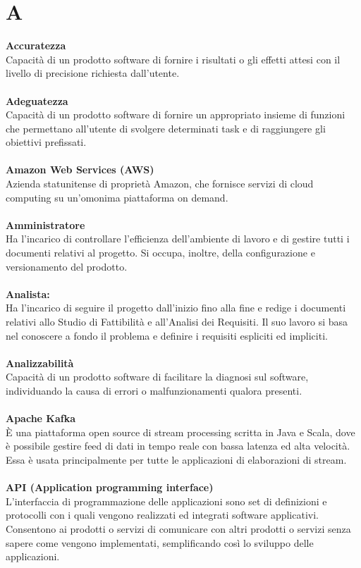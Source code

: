 \section{A}
\textbf{Accuratezza}\\
Capacità di un prodotto software di fornire i risultati o gli effetti attesi con il livello di precisione richiesta
dall'utente.\\ \\
\textbf{Adeguatezza}\\
Capacità di un prodotto software di fornire un appropriato insieme di funzioni che permettano all'utente di svolgere determinati task e di raggiungere gli obiettivi prefissati.\\ \\
\textbf{Amazon Web Services (AWS)}\\
Azienda statunitense di proprietà Amazon, che fornisce servizi di cloud computing su un'omonima piattaforma on demand. \\ \\
\textbf{Amministratore}\\
Ha l'incarico di controllare l'efficienza dell'ambiente di lavoro e di gestire tutti i documenti relativi al progetto. Si occupa, inoltre, della configurazione e versionamento del prodotto.\\ \\
\textbf{Analista:}\\
Ha l'incarico di seguire il progetto dall'inizio fino alla fine e redige i documenti relativi allo Studio di Fattibilità e all'Analisi dei Requisiti. Il suo lavoro si basa nel conoscere a fondo il problema e definire i requisiti espliciti ed impliciti.\\ \\
\textbf{Analizzabilità}\\
Capacità di un prodotto software di facilitare la diagnosi sul software, individuando la causa di errori o malfunzionamenti qualora presenti.\\ \\
\textbf{Apache Kafka}\\
È una piattaforma open source di stream processing scritta in Java e Scala, dove è possibile gestire feed di dati in tempo reale con bassa latenza ed alta velocità. Essa è usata principalmente per tutte le applicazioni di elaborazioni di stream.  \\ \\
\textbf{API (Application programming interface)}\\
L'interfaccia di programmazione delle applicazioni sono set di definizioni e protocolli con i quali vengono realizzati ed integrati software applicativi. Consentono ai  prodotti o servizi di comunicare con altri prodotti o servizi senza sapere come vengono implementati, semplificando così lo sviluppo delle applicazioni. \\ \\
